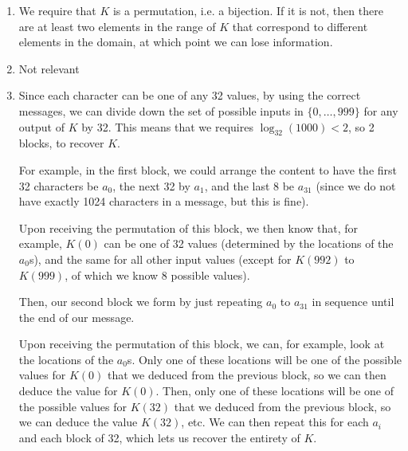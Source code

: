 \begin{enumerate}[label=(\alph*)]
  \item
    We require that $K$ is a permutation, i.e. a bijection. If it is not, then there are at least two elements in the range of $K$ that correspond to different elements in the domain, at which point we can lose information.

  \item
    Not relevant

  \item
    Since each character can be one of any 32 values, by using the correct messages, we can divide down the set of possible inputs in $\{0,\ldots,999\}$ for any output of $K$ by 32. This means that we requires $\log_{32}(1000) < 2$, so 2 blocks, to recover $K$.

    For example, in the first block, we could arrange the content to have the first 32 characters be $a_0$, the next 32 by $a_1$, and the last 8 be $a_{31}$ (since we do not have exactly 1024 characters in a message, but this is fine).

    Upon receiving the permutation of this block, we then know that, for example, $K(0)$ can be one of 32 values (determined by the locations of the $a_0$s), and the same for all other input values (except for $K(992)$ to $K(999)$, of which we know 8 possible values).

    Then, our second block we form by just repeating $a_0$ to $a_31$ in sequence until the end of our message.

    Upon receiving the permutation of this block, we can, for example, look at the locations of the $a_0$s. Only one of these locations will be one of the possible values for $K(0)$ that we deduced from the previous block, so we can then deduce the value for $K(0)$. Then, only one of these locations will be one of the possible values for $K(32)$ that we deduced from the previous block, so we can deduce the value $K(32)$, etc. We can then repeat this for each $a_i$ and each block of 32, which lets us recover the entirety of $K$.



        
\end{enumerate}

